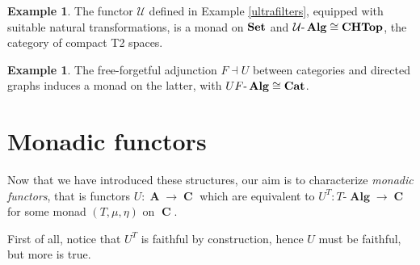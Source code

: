 \documentclass[a4paper,11pt,fullpage,oneside,openany]{amsbook}
\newcommand{\catname}[1]{{\normalfont\textbf{#1}}}
\DeclareMathOperator{\Alg}{\mathbf{Alg}}
\newcommand{\Set}{\catname{Set}}
\newcommand{\CHTop}{\catname{CHTop}}
\newcommand{\Cat}{\catname{Cat}}
\DeclareMathOperator{\A}{\mathbf{A}}
\DeclareMathOperator{\C}{\mathbf{C}}
\theoremstyle{definition}
\theoremstyle{definition}
\newtheorem{exmp}[thm]{Example} %
\theoremstyle{remark}
\begin{document}
	\begin{exmp}
		The functor $\mathcal{U}$ defined in Example \ref{ultrafilters}, equipped with suitable natural transformations, is a monad on $\Set$ and $\mathcal{U}\mbox{-}\Alg\cong \CHTop$, the category of compact T2 spaces.
	\end{exmp}

	\begin{exmp}
		The free-forgetful adjunction $F\dashv U$ between categories and directed graphs induces a monad on the latter, with $UF\mbox{-}\Alg\cong\Cat$.
	\end{exmp}

	\section{Monadic functors}
	
	Now that we have introduced these structures, our aim is to characterize \emph{monadic functors}, that is functors $U\colon\A\rightarrow\C$ which are equivalent to $U^T\colon T\mbox{-}\Alg\rightarrow\C$ for some monad $(T,\mu,\eta)$ on $\C$.

	First of all, notice that $U^T$ is faithful by construction, hence $U$ must be faithful, but more is true.
	
\end{document}
